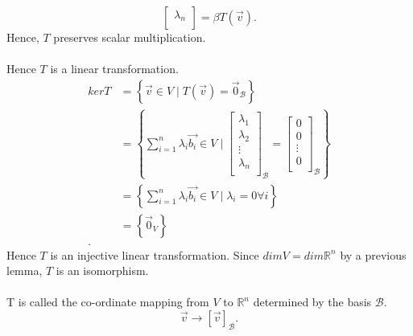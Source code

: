 \documentclass{report}
\begin{document}
{{\[\begin{bmatrix}
    \lambda_n\\
    \end{bmatrix}             = \beta T \left(  \vec{ v}  \right)
    .\] 
    Hence, $ T$ preserves scalar multiplication.\\
    \\
    Hence $ T$ is a linear transformation.\\
    \begin{align*}
      ker T &= \left\{ \vec{ v}  \in V \mid T \left(  \vec{ v}  \right) = \vec{ 0} _{ \mathcal{B}} \right\}\\
      &= \left\{ \sum\limits_{i=1}^{n} \lambda_i \vec{ b_i} \in V \mid  \begin{bmatrix}
      \lambda_1\\
      \lambda_2\\
     \vdots\\
      \lambda_n\\
      \end{bmatrix} _{ \mathcal{B}} = \begin{bmatrix}
      0\\
      0\\
      \vdots\\
      0\\
      \end{bmatrix} _{ \mathcal{B}} \right\}\\
      &= \left\{ \sum\limits_{i=1}^{n} \lambda_i \vec{ b_i} \in V \mid \lambda_i = 0 \forall i \right\}\\
      &= \left\{ \vec{ 0} _V \right\}\\
    .\end{align*}
    Hence $ T$ is an injective linear transformation. Since $ dim V = dim \mathbb{R} ^{n}$ by a previous lemma, $ T$ is an isomorphism.\\
    \\
    T is called the co-ordinate mapping from $ V$ to $ \mathbb{R} ^{n}$ determined by the basis $ \mathcal{B}$.\\
    \[
     \vec{ v}  \to \left[ \vec{ v}  \right] _{ \mathcal{B}}
    .\] 
  }
   }
\end{document}
